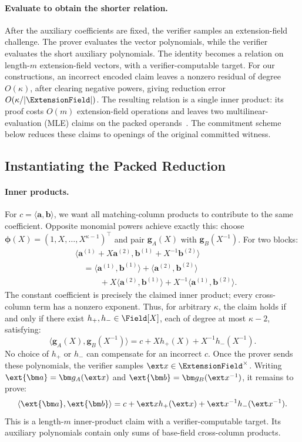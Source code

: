 \paragraph{Evaluate to obtain the shorter relation.}
After the auxiliary coefficients are fixed, the verifier samples an
extension-field challenge. The prover evaluates the vector polynomials,
while the verifier evaluates the short auxiliary polynomials.
The identity becomes a relation on length-\(m\) extension-field
vectors, with a verifier-computable target.
For our constructions, an incorrect encoded claim leaves a
nonzero residual of degree \(O(\kappa)\), after clearing negative
powers, giving reduction error \(O(\kappa/|\ExtensionField|)\).
The resulting relation is a single inner product: its proof costs
\(O(m)\) extension-field operations and leaves two multilinear-evaluation
(MLE) claims on the packed operands~\cite{asiacrypt/CCYY25}.
The commitment scheme below reduces these claims to openings of the
original committed witness.

\subsection{Instantiating the Packed Reduction}

\paragraph{Inner products.}
For \(c=\langle\bm a,\bm b\rangle\), we want all matching-column
products to contribute to the same coefficient. Opposite monomial
powers achieve exactly this: choose
\(\bm\phi(X)=(1,X,\ldots,X^{\kappa-1})^\top\) and pair
\(\bm g_A(X)\) with \(\bm g_B(X^{-1})\).
For two blocks:
\[
\begin{aligned}
 &\langle\bm a^{(1)}+X\bm a^{(2)},
          \bm b^{(1)}+X^{-1}\bm b^{(2)}\rangle\\
 &\quad=
   \langle\bm a^{(1)},\bm b^{(1)}\rangle
   +\langle\bm a^{(2)},\bm b^{(2)}\rangle\\
 &\qquad\quad
   +X\langle\bm a^{(2)},\bm b^{(1)}\rangle
   +X^{-1}\langle\bm a^{(1)},\bm b^{(2)}\rangle.
\end{aligned}
\]
The constant coefficient is precisely the claimed inner product;
every cross-column term has a nonzero exponent. Thus, for arbitrary
\(\kappa\), the claim holds if and only if there exist
\(h_+,h_-\in\Field[X]\), each of degree at most \(\kappa-2\), satisfying:
\begin{equation*}
    \langle\bm g_A(X),\bm g_B(X^{-1})\rangle
    =c+Xh_+(X)+X^{-1}h_-(X^{-1}).
\end{equation*}
No choice of \(h_+\) or \(h_-\) can compensate for an incorrect \(c\).
Once the prover sends these polynomials, the verifier samples
\(\ext x\in\ExtensionField^\times\).
Writing \(\ext{\bm a}=\bm g_A(\ext x)\) and
\(\ext{\bm b}=\bm g_B(\ext x^{-1})\), it remains to prove:
\[
    \langle\ext{\bm a},\ext{\bm b}\rangle
    =c+\ext xh_+(\ext x)+\ext x^{-1}h_-(\ext x^{-1}).
\]
This is a length-\(m\) inner-product claim with a verifier-computable
target. Its auxiliary polynomials contain only sums of base-field
cross-column products.

